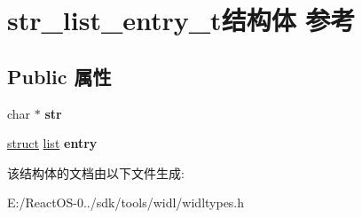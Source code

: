 \hypertarget{structstr__list__entry__t}{}\section{str\+\_\+list\+\_\+entry\+\_\+t结构体 参考}
\label{structstr__list__entry__t}
\subsection*{Public 属性}
\begin{DoxyCompactItemize}
\item 
\mbox{\label{structstr__list__entry__t_aeeb3367ef091adf6c57aa340d373abbc}} 
char $\ast$ {\bfseries str}
\item 
\mbox{\label{structstr__list__entry__t_ac99ead76b900390551d65358424169b0}} 
\hyperlink{interfacestruct}{struct} \hyperlink{classlist}{list} {\bfseries entry}
\end{DoxyCompactItemize}


该结构体的文档由以下文件生成\+:\begin{DoxyCompactItemize}
\item 
E\+:/\+React\+O\+S-\/0../sdk/tools/widl/widltypes.\+h\end{DoxyCompactItemize}
